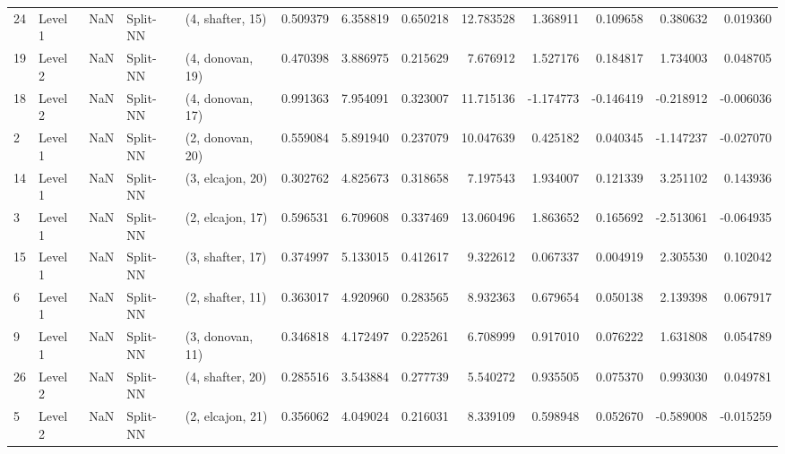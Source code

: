 \begin{tabular}{llrllrrrrrrrr}
24 &   Level 1 &    NaN &       Split-NN &  (4, shafter, 15) &   0.509379 &   6.358819 &  0.650218 &  12.783528 &             1.368911 &               0.109658 &            0.380632 &              0.019360 \\
19 &   Level 2 &    NaN &       Split-NN &  (4, donovan, 19) &   0.470398 &   3.886975 &  0.215629 &   7.676912 &             1.527176 &               0.184817 &            1.734003 &              0.048705 \\
18 &   Level 2 &    NaN &       Split-NN &  (4, donovan, 17) &   0.991363 &   7.954091 &  0.323007 &  11.715136 &            -1.174773 &              -0.146419 &           -0.218912 &             -0.006036 \\
2  &   Level 1 &    NaN &       Split-NN &  (2, donovan, 20) &   0.559084 &   5.891940 &  0.237079 &  10.047639 &             0.425182 &               0.040345 &           -1.147237 &             -0.027070 \\
14 &   Level 1 &    NaN &       Split-NN &  (3, elcajon, 20) &   0.302762 &   4.825673 &  0.318658 &   7.197543 &             1.934007 &               0.121339 &            3.251102 &              0.143936 \\
3  &   Level 1 &    NaN &       Split-NN &  (2, elcajon, 17) &   0.596531 &   6.709608 &  0.337469 &  13.060496 &             1.863652 &               0.165692 &           -2.513061 &             -0.064935 \\
15 &   Level 1 &    NaN &       Split-NN &  (3, shafter, 17) &   0.374997 &   5.133015 &  0.412617 &   9.322612 &             0.067337 &               0.004919 &            2.305530 &              0.102042 \\
6  &   Level 1 &    NaN &       Split-NN &  (2, shafter, 11) &   0.363017 &   4.920960 &  0.283565 &   8.932363 &             0.679654 &               0.050138 &            2.139398 &              0.067917 \\
9  &   Level 1 &    NaN &       Split-NN &  (3, donovan, 11) &   0.346818 &   4.172497 &  0.225261 &   6.708999 &             0.917010 &               0.076222 &            1.631808 &              0.054789 \\
26 &   Level 2 &    NaN &       Split-NN &  (4, shafter, 20) &   0.285516 &   3.543884 &  0.277739 &   5.540272 &             0.935505 &               0.075370 &            0.993030 &              0.049781 \\
5  &   Level 2 &    NaN &       Split-NN &  (2, elcajon, 21) &   0.356062 &   4.049024 &  0.216031 &   8.339109 &             0.598948 &               0.052670 &           -0.589008 &             -0.015259 \\

\end{tabular}
